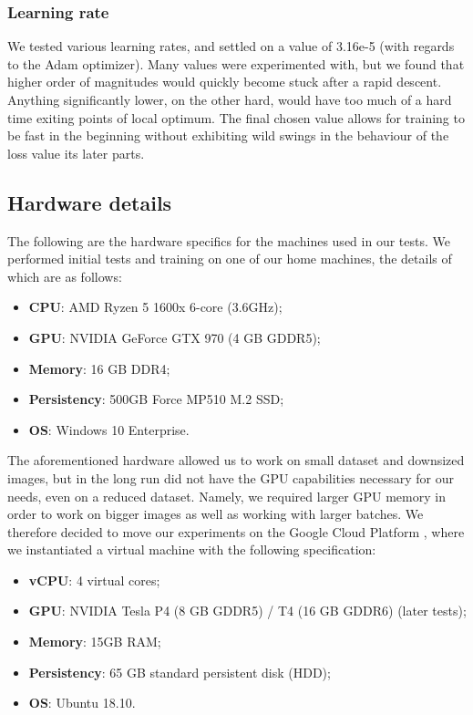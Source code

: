 \documentclass[twoside,twocolumn]{article}
\begin{document}
\subsubsection{Learning rate}
We tested various learning rates, and settled on a value of  3.16e-5 (with regards to the Adam optimizer). Many values were experimented with, but we found that higher order of magnitudes would quickly become stuck after a rapid descent. Anything significantly lower, on the other hard, would have too much of a hard time exiting points of local optimum. 
The final chosen value allows for training to be fast in the beginning without exhibiting wild swings in the behaviour of the loss value its later parts. 


\subsection{Hardware details}

The following are the hardware specifics for the machines used in our tests. We performed initial tests and training on one of our home machines, the details of which are as follows:
\begin{itemize}
\item \textbf{CPU}: AMD Ryzen 5 1600x  6-core (3.6GHz);
\item \textbf{GPU}: NVIDIA GeForce GTX 970 (4 GB GDDR5); 
\item \textbf{Memory}: 16 GB DDR4;
\item \textbf{Persistency}: 500GB Force MP510 M.2 SSD;
\item \textbf{OS}: Windows 10 Enterprise.
\end{itemize}

The aforementioned hardware allowed us to work on small dataset and downsized images, but in the long run did not have the GPU capabilities necessary for our needs, even on a reduced dataset. Namely, we required larger GPU memory in order to work on bigger images as well as working with larger batches. We therefore decided to move our experiments on the Google Cloud Platform \cite{GCP}, where we instantiated a virtual machine with the following specification:

\begin{itemize}
	\item \textbf{vCPU}: 4 virtual cores;
	\item \textbf{GPU}: NVIDIA Tesla P4 (8 GB GDDR5) / T4 (16 GB GDDR6) (later tests); 
	\item \textbf{Memory}: 15GB RAM;
	\item \textbf{Persistency}: 65 GB standard persistent disk (HDD);
	\item \textbf{OS}: Ubuntu 18.10.
\end{itemize}
\end{document}
